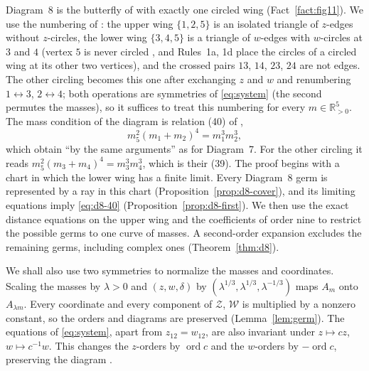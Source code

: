 \documentclass[11pt]{amsart}
\theoremstyle{definition}
\theoremstyle{remark}
\newcommand{\Rp}{\mathbb{R}_{>0}}
\newcommand{\ord}{\operatorname{ord}}
\begin{document}
Diagram~8 is the butterfly of \cite[\S7.4]{AK} with exactly one circled wing
(Fact~\ref{fact:fig11}).  We use the numbering of \cite[\S8.8]{AK}: the upper wing $\{1,2,5\}$
is an isolated triangle of $z$-edges without $z$-circles, the lower wing $\{3,4,5\}$ is a
triangle of $w$-edges with $w$-circles at $3$ and $4$ (vertex $5$ is never circled
\cite[\S7.4]{AK}, and Rules~1a, 1d place the circles of a circled wing at its other two
vertices), and the crossed pairs $13$, $14$, $23$, $24$ are not edges.
The other circling becomes this one after exchanging $z$ and $w$ and renumbering
$1\leftrightarrow3$, $2\leftrightarrow4$; both operations are symmetries of \eqref{eq:system}
(the second permutes the masses), so it suffices to treat this numbering for every
$m\in\Rp^5$.
The mass condition of the diagram is relation (40) of \cite[\S8.8]{AK},
\begin{equation}\label{eq:d8-40}
  m_5^2(m_1+m_2)^4=m_1^3m_2^3,
\end{equation}
which \cite[p.~578]{AK} obtain ``by the same arguments'' as for Diagram~7.  For the other
circling it reads $m_5^2(m_3+m_4)^4=m_3^3m_4^3$, which is their (39).
The proof begins with a chart in which the lower wing has a finite limit.
Every Diagram~8 germ is represented by a ray in this chart
(Proposition~\ref{prop:d8-cover}), and its limiting equations imply
\eqref{eq:d8-40} (Proposition~\ref{prop:d8-first}).  We then use the
{exact distance equations on the upper wing and the coefficients of order nine
to restrict the possible germs to one curve of}
masses.  A second-order expansion excludes the remaining germs, including complex
ones (Theorem~\ref{thm:d8}).

We shall also use two symmetries to normalize the masses and coordinates.  Scaling the
masses by $\lambda>0$ and $(z,w,\delta)$ by
$(\lambda^{1/3},\lambda^{1/3},\lambda^{-1/3})$ maps $A_m$ onto $A_{\lambda m}$.
Every coordinate and every component of $\mathcal Z$, $\mathcal W$ is multiplied by a
nonzero constant, so the orders and diagrams are preserved (Lemma~\ref{lem:germ}).
The equations of \eqref{eq:system}, apart from $z_{12}=w_{12}$, are also invariant under
$z\mapsto cz$, $w\mapsto c^{-1}w$.  This changes the $z$-orders by $\ord c$ and the
$w$-orders by $-\ord c$, preserving the diagram \cite[p.~547]{AK}.
\end{document}
